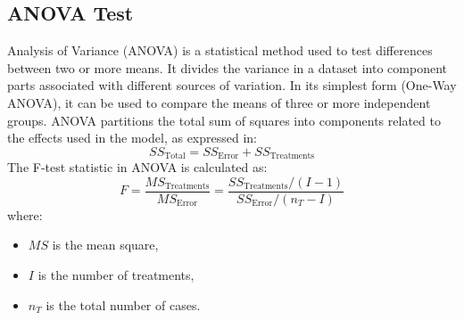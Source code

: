 \subsection*{ANOVA Test}
Analysis of Variance (ANOVA) is a statistical method used to test differences between two or more means. It divides the variance in a dataset into component parts associated with different sources of variation. In its simplest form (One-Way ANOVA), it can be used to compare the means of three or more independent groups. ANOVA partitions the total sum of squares into components related to the effects used in the model, as expressed in:
\[ SS_{\text{Total}}=SS_{\text{Error}}+SS_{\text{Treatments}} \]
The F-test statistic in ANOVA is calculated as:
\[ F = \frac{MS_{\text{Treatments}}}{MS_{\text{Error}}} = \frac{SS_{\text{Treatments}}/(I-1)}{SS_{\text{Error}}/(n_{T}-I)} \]
where:
\begin{itemize}
    \item \( MS \) is the mean square,
    \item \( I \) is the number of treatments,
    \item \( n_T \) is the total number of cases.
\end{itemize}
